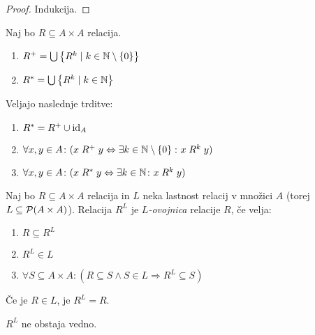 \documentclass[12pt, a4paper]{article}
\renewcommand{\implies}{\Rightarrow}
\renewcommand{\iff}{\Leftrightarrow}
\begin{document}
\begin{proof}
Indukcija.
\end{proof}

\begin{definicija}
Naj bo $R\subseteq A\times A$ relacija.

\begin{enumerate}
\item $R^+=\bigcup\left\{R^k\mid k\in\mathbb{N}\setminus\left\{0\right\}\right\}$
\item $R^*=\bigcup\left\{R^k\mid k\in\mathbb{N}\right\}$
\end{enumerate}
\end{definicija}

\begin{trditev}
Veljajo naslednje trditve:

\begin{enumerate}
\item $R^*=R^+\cup\operatorname{id}_A$
\item $\forall x,y\in A\colon(x\rel{R^+}y\iff\exists k\in\N\setminus\set{0}\colon x\rel{R^k}y)$
\item $\forall x,y\in A\colon(x\rel{R^*}y\iff\exists k\in\N\colon x\rel{R^k}y)$
\end{enumerate}
\end{trditev}

\obvs

\begin{okvir}
\begin{definicija}
Naj bo $R\subseteq A\times A$ relacija in $L$ neka lastnost relacij v množici $A$ (torej $L\subseteq\mathcal{P}(A\times A)$). Relacija $R^L$ je \emph{$L$-ovojnica} relacije $R$, če velja:

\begin{enumerate}
\item $R\subseteq R^L$
\item $R^L\in L$
\item $\forall S\subseteq A\times A\colon(R\subseteq S\land S\in L\implies R^L\subseteq S)$
\end{enumerate}
\end{definicija}
\end{okvir}

\begin{opomba}
Če je $R\in L$, je $R^L=R$.
\end{opomba}

\begin{opomba}
$R^L$ ne obstaja vedno.
\end{opomba}
\end{document}
